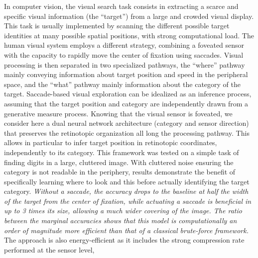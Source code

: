 In computer vision, the visual search task consists in extracting a scarce and specific visual information (the ``target'') from a large and crowded visual display. This task is usually implemented by scanning the different possible target identities at many possible spatial positions, with strong computational load. The human visual system employs a different strategy, combining a foveated sensor with the capacity to rapidly move the center of fixation using saccades. Visual processing is then separated in two specialized pathways, the ``where'' pathway mainly conveying information about target position and speed in the peripheral space, and the ``what'' pathway mainly information about the category of the target. 
Saccade-based visual exploration can be idealized as an inference process, assuming that the target position and category are independently drawn from a generative measure process. Knowing that the visual sensor is foveated, we consider here a dual neural network architecture (category and  sensor direction) that preserves the retinotopic organization all long the processing pathway. This allows in particular to infer target position in retinotopic coordinates, independently to its category. This framework was tested on a simple task of finding digits in a large, cluttered image. With cluttered noise ensuring the category is not readable in the periphery, results demonstrate the benefit of specifically learning where to look and this before actually identifying the target category. \emph{Without a saccade, the accuracy drops to the baseline at half the width of the target from the center of fixation, while actuating a saccade is beneficial in up to 3 times its size, allowing a much wider covering of the image. The ratio between the marginal accuracies shows that this model is computationally an order of magnitude more efficient than that of a classical brute-force framework.} %
The approach is also energy-efficient as it includes the strong compression rate performed at the sensor level, %
